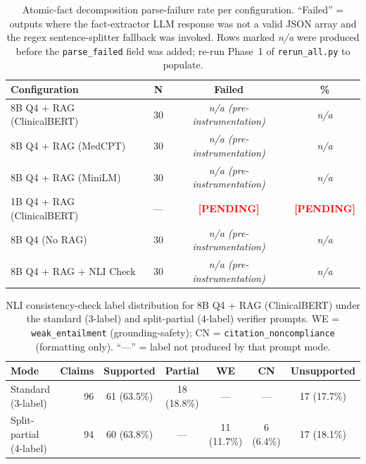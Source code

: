 \begin{table}[t]
\centering
\caption{Atomic-fact decomposition parse-failure rate per
configuration. ``Failed'' = outputs where the fact-extractor LLM
response was not a valid JSON array and the regex sentence-splitter
fallback was invoked. Rows marked \textit{n/a} were produced before
the \texttt{parse\_failed} field was added; re-run Phase~1 of
\texttt{rerun\_all.py} to populate.}
\label{tab:parse_fail}
\setlength{\tabcolsep}{5pt}
\begin{tabular}{@{}lccc@{}}
\toprule
\textbf{Configuration} & \textbf{N} & \textbf{Failed} & \textbf{\%} \\
\midrule
8B Q4 + RAG (ClinicalBERT) & 30 & \textit{n/a (pre-instrumentation)} & \textit{n/a} \\
8B Q4 + RAG (MedCPT) & 30 & \textit{n/a (pre-instrumentation)} & \textit{n/a} \\
8B Q4 + RAG (MiniLM) & 30 & \textit{n/a (pre-instrumentation)} & \textit{n/a} \\
1B Q4 + RAG (ClinicalBERT) & --- & \textcolor{red}{\textbf{[PENDING]}} & \textcolor{red}{\textbf{[PENDING]}} \\
8B Q4 (No RAG) & 30 & \textit{n/a (pre-instrumentation)} & \textit{n/a} \\
8B Q4 + RAG + NLI Check & 30 & \textit{n/a (pre-instrumentation)} & \textit{n/a} \\
\bottomrule
\end{tabular}
\end{table}

\begin{table}[t]
\centering
\caption{NLI consistency-check label distribution for 8B Q4 + RAG
(ClinicalBERT) under the standard (3-label) and split-partial
(4-label) verifier prompts. WE = \texttt{weak\_entailment}
(grounding-safety); CN = \texttt{citation\_noncompliance}
(formatting only). ``---'' = label not produced by that prompt mode.}
\label{tab:split_verifier}
\setlength{\tabcolsep}{4pt}
\begin{tabular}{@{}lrccccc@{}}
\toprule
\textbf{Mode} & \textbf{Claims} & \textbf{Supported} & \textbf{Partial} & \textbf{WE} & \textbf{CN} & \textbf{Unsupported} \\
\midrule
Standard (3-label) & 96 & 61 (63.5\%) & 18 (18.8\%) & --- & --- & 17 (17.7\%) \\
Split-partial (4-label) & 94 & 60 (63.8\%) & --- & 11 (11.7\%) & 6 (6.4\%) & 17 (18.1\%) \\
\bottomrule
\end{tabular}
\end{table}

